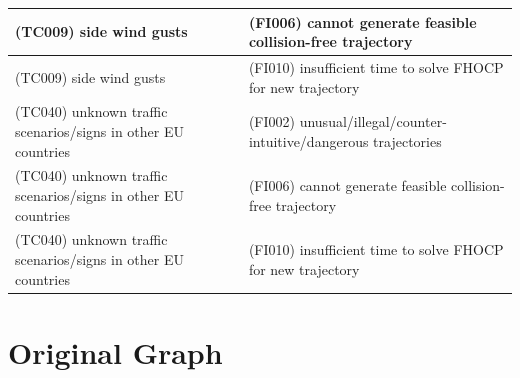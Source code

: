 \documentclass{article}
\begin{document}
\begin{longtable}{|p{8cm}|p{8cm}|}
\cellcolor{cRed}(TC009) side wind gusts& \cellcolor{cBlue}(FI006) cannot generate feasible collision-free trajectory\\\hline
\cellcolor{cRed}(TC009) side wind gusts& \cellcolor{cBlue}(FI010) insufficient time to solve FHOCP for new trajectory\\\hline
\cellcolor{cYellow}(TC040) unknown traffic scenarios/signs in other EU countries& \cellcolor{cBlue}(FI002) unusual/illegal/counter-intuitive/dangerous trajectories\\\hline
\cellcolor{cYellow}(TC040) unknown traffic scenarios/signs in other EU countries& \cellcolor{cBlue}(FI006) cannot generate feasible collision-free trajectory\\\hline
\cellcolor{cYellow}(TC040) unknown traffic scenarios/signs in other EU countries& \cellcolor{cBlue}(FI010) insufficient time to solve FHOCP for new trajectory\\\hline
\end{longtable}




\newpage
\section{Original Graph}
\end{document}
